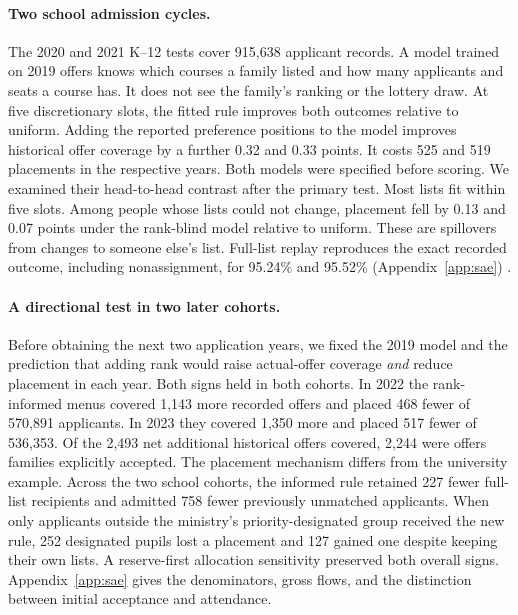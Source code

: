 \paragraph{Two school admission cycles.}
The 2020 and 2021 K--12 tests cover 915,638 applicant records. A model trained on 2019 offers knows which courses a family listed and how many applicants and seats a course has. It does not see the family's ranking or the lottery draw. At five discretionary slots, the fitted rule improves both outcomes relative to uniform. Adding the reported preference positions to the model improves historical offer coverage by a further 0.32 and 0.33 points. It costs 525 and 519 placements in the respective years. Both models were specified before scoring. We examined their head-to-head contrast after the primary test. Most lists fit within five slots. Among people whose lists could not change, placement fell by 0.13 and 0.07 points under the rank-blind model relative to uniform. These are spillovers from changes to someone else's list. Full-list replay reproduces the exact recorded outcome, including nonassignment, for 95.24\% and 95.52\% (Appendix~\ref{app:sae}) \citep{saedata,correaschool}.

\paragraph{A directional test in two later cohorts.}
Before obtaining the next two application years, we fixed the 2019 model and the prediction that adding rank would raise actual-offer coverage \emph{and} reduce placement in each year. Both signs held in both cohorts. In 2022 the rank-informed menus covered 1,143 more recorded offers and placed 468 fewer of 570,891 applicants. In 2023 they covered 1,350 more and placed 517 fewer of 536,353. Of the 2,493 net additional historical offers covered, 2,244 were offers families explicitly accepted. The placement mechanism differs from the university example. Across the two school cohorts, the informed rule retained 227 fewer full-list recipients and admitted 758 fewer previously unmatched applicants. When only applicants outside the ministry's priority-designated group received the new rule, 252 designated pupils lost a placement and 127 gained one despite keeping their own lists. A reserve-first allocation sensitivity preserved both overall signs. Appendix~\ref{app:sae} gives the denominators, gross flows, and the distinction between initial acceptance and attendance.


